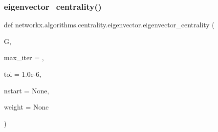 \subsubsection{\texorpdfstring{eigenvector\+\_\+centrality()}{eigenvector\_centrality()}}
{\footnotesize\ttfamily def networkx.\+algorithms.\+centrality.\+eigenvector.\+eigenvector\+\_\+centrality (\begin{DoxyParamCaption}\item[{}]{G,  }\item[{}]{max\+\_\+iter = {},  }\item[{}]{tol = {\ttfamily 1.0e-\/6},  }\item[{}]{nstart = {\ttfamily None},  }\item[{}]{weight = {\ttfamily None} }\end{DoxyParamCaption})}

